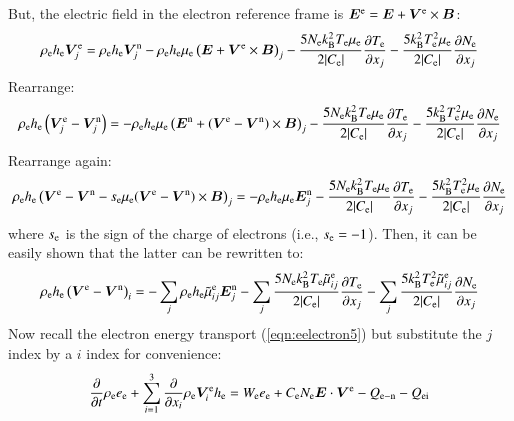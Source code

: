 \documentclass{warpdoc}
\renewcommand{\vec}[1]{\bm{#1}}
\begin{document}
% 
But, the electric field in the electron reference frame is $\vec{E}^{\rm e}=\vec{E}+\vec{V}^{\rm e}\times \vec{B}$:
%
\begin{equation}
  \rho_{\rm e} h_{\rm e}  \vec{V}^{\rm e}_j
  = \rho_{\rm e} h_{\rm e} \vec{V}^{\rm n}_j 
  - \rho_{\rm e} h_{\rm e} \mu_{\rm e} \left( \vec{E}+\vec{V}^{\rm e}\times\vec{B}\right)_j 
  -\frac{5 N_{\rm e} k_{\rm B}^2 T_{\rm e} \mu_{\rm e} }{2 |C_{\rm e}| } \frac{  \partial T_{\rm e}}{\partial x_j} 
  -\frac{5 k_{\rm B}^2 T_{\rm e}^2 \mu_{\rm e}}{2 |C_{\rm e}| } \frac{\partial N_{\rm e}  }{\partial x_j} 
\end{equation}
% 
Rearrange:
%
\begin{equation}
  \rho_{\rm e} h_{\rm e} \left( \vec{V}^{\rm e}_j - \vec{V}^{\rm n}_j \right)
  = 
  - \rho_{\rm e} h_{\rm e} \mu_{\rm e} \left( \vec{E}^{\rm n}+(\vec{V}^{\rm e}-\vec{V}^{\rm n})\times\vec{B}\right)_j 
  -\frac{5 N_{\rm e} k_{\rm B}^2 T_{\rm e} \mu_{\rm e} }{2 |C_{\rm e}| } \frac{  \partial T_{\rm e}}{\partial x_j} 
  -\frac{5 k_{\rm B}^2 T_{\rm e}^2 \mu_{\rm e}}{2 |C_{\rm e}| } \frac{\partial N_{\rm e}  }{\partial x_j} 
\end{equation}
% 
Rearrange again:
%
\begin{equation}
  \rho_{\rm e} h_{\rm e} \left( \vec{V}^{\rm e} - \vec{V}^{\rm n} -s_{\rm e} \mu_{\rm e}(\vec{V}^{\rm e}-\vec{V}^{\rm n})\times\vec{B}\right)_j
  = 
  - \rho_{\rm e} h_{\rm e} \mu_{\rm e} \vec{E}^{\rm n}_j 
  -\frac{5 N_{\rm e} k_{\rm B}^2 T_{\rm e} \mu_{\rm e} }{2 |C_{\rm e}| } \frac{  \partial T_{\rm e}}{\partial x_j} 
  -\frac{5 k_{\rm B}^2 T_{\rm e}^2 \mu_{\rm e}}{2 |C_{\rm e}| } \frac{\partial N_{\rm e}  }{\partial x_j} 
\end{equation}
% 
where $s_{\rm e}$ is the sign of the charge of electrons (i.e., $s_{\rm e}=-1$). Then, it can be easily shown that the latter can be rewritten to:
%
\begin{equation}
  \rho_{\rm e} h_{\rm e} \left( \vec{V}^{\rm e} - \vec{V}^{\rm n} \right)_i
  = 
  - \sum_j \rho_{\rm e} h_{\rm e} \tilde{\mu}_{ij}^{\rm e} \vec{E}^{\rm n}_j 
  -\sum_j \frac{5 N_{\rm e} k_{\rm B}^2 T_{\rm e} \tilde{\mu}_{ij}^{\rm e} }{2 |C_{\rm e}| } \frac{  \partial T_{\rm e}}{\partial x_j} 
  -\sum_j \frac{5 k_{\rm B}^2 T_{\rm e}^2 \tilde{\mu}_{ij}^{\rm e}}{2 |C_{\rm e}| } \frac{\partial N_{\rm e}  }{\partial x_j} 
\end{equation}
% 
Now recall the electron energy transport (\ref{eqn:eelectron5}) but substitute the $j$ index by a $i$ index for convenience:
%
\begin{equation}
 \frac{\partial }{\partial t}\rho_{\rm e} e_{\rm e} + \sum_{i=1}^3  \frac{\partial }{\partial x_i} \rho_{\rm e} \vec{V}^{\rm e}_i h_{\rm e} 
= 
 W_{\rm e} e_{\rm e}
+   C_{\rm e} N_{\rm e} \vec{E} \cdot \vec{V}^{\rm e}  
- Q_{\rm e-n}
- Q_{\rm ei}
\end{equation}
\end{document}
